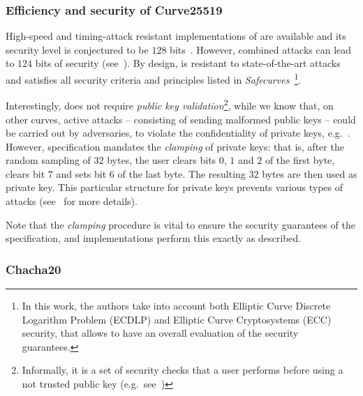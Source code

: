 \subsubsection{Efficiency and security of Curve25519}\label{instantiation:enc:algos:curve25519sec}
High-speed and timing-attack resistant implementations of  are available and its security level is conjectured to be $128$ bits~\cite[Section 1]{bernstein2006curve25519}. However, combined attacks can lead to $124$ bits of security (see~\cite[Section ``Twist Security'']{safecurves2017}). By design,  is resistant to state-of-the-art attacks and satisfies all security criteria and principles listed in \emph{Safecurves}~\cite{safecurves2017}\footnote{In this work, the authors take into account both Elliptic Curve Discrete Logarithm Problem (ECDLP) and Elliptic Curve Cryptosystems (ECC) security, that allows to have an overall evaluation of the security guarantees.}.

Interestingly,  does not require \emph{public key validation}\footnote{Informally, it is a set of security checks that a user performs before using a not trusted public key (e.g.~see~\cite{barker2018recommendation})}, while we know that, on other curves, active attacks -- consisting of sending malformed public keys -- could be carried out by adversaries, to violate the confidentiality of private keys, e.g.~\cite{antipa2003validation}. However,  specification mandates the \emph{clamping} of private keys: that is, after the random sampling of $32$ bytes, the user clears bits $0$, $1$ and $2$ of the first byte, clears bit $7$ and sets bit $6$ of the last byte. The resulting $32$ bytes are then used as private key. This particular structure for private keys prevents various types of attacks (see~\cite[Section 3]{bernstein2006curve25519} for more details).

\begin{notebox}
    Note that the \emph{clamping} procedure is vital to ensure the security guarantees of the  specification, and implementations \MUST{} perform this exactly as described.
\end{notebox}

\subsubsection{Chacha20}\label{instantiation:enc:algos:chacha20}

